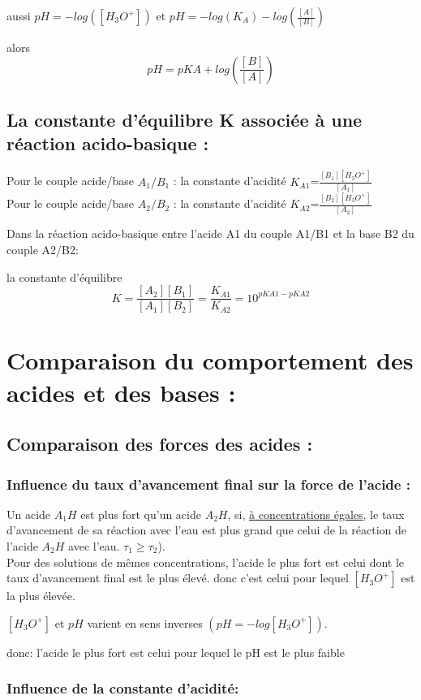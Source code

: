\documentclass[12pt]{article}
\begin{document}
aussi $pH = -log([H_3O^+])$ et $pH = -log(K_A) - log(\frac{[A]}{[B]})$

alors $$pH = pKA + log(\frac{[B]}{[A]})$$


\subsection{La constante d'équilibre K associée à une réaction acido-basique : }

Pour le couple acide/base $A_1/B_1$ :  la constante d'acidité $K_{A1}$=$\frac{[B_1][H_3O^+]}{[A_1]}$
\\Pour le couple acide/base $A_2/B_2$ :  la constante d'acidité $K_{A2}$=$\frac{[B_2][H_3O^+]}{[A_2]}$

Dans la réaction acido-basique entre l'acide A1 du couple A1/B1 et la base B2 du couple A2/B2:

 la constante d’équilibre $$K=\frac{[A_2][B_1]}{[A_1][B_2]} = \frac{K_{A1}}{K_{A2}} = 10^{pKA1 - pKA2}$$


\section{Comparaison du comportement des acides et des bases : }
\subsection{Comparaison des forces des acides : }
\subsubsection{Influence du taux d'avancement final sur la force de l'acide : }
Un acide $A_1H$ est plus fort qu'un acide $A_2H$, si, \underline{à concentrations égales}, le taux d'avancement de sa réaction avec l'eau
est plus grand que celui de la réaction de l'acide $A_2H$ avec l'eau. $\tau_1\geq \tau_2 $).
\\Pour des solutions de mêmes concentrations, l’acide le plus fort est celui dont le taux d’avancement final est le plus élevé.
donc c’est celui pour lequel $[H_3O^+]$ est la plus élevée.

$[H_3O^+]$ et $pH$ varient en sens inverses $(pH=-log[H_3O^+])$. 

donc: l’acide le plus fort est celui pour lequel le pH est le plus faible

\subsubsection{Influence de la constante d'acidité:}
\end{document}
